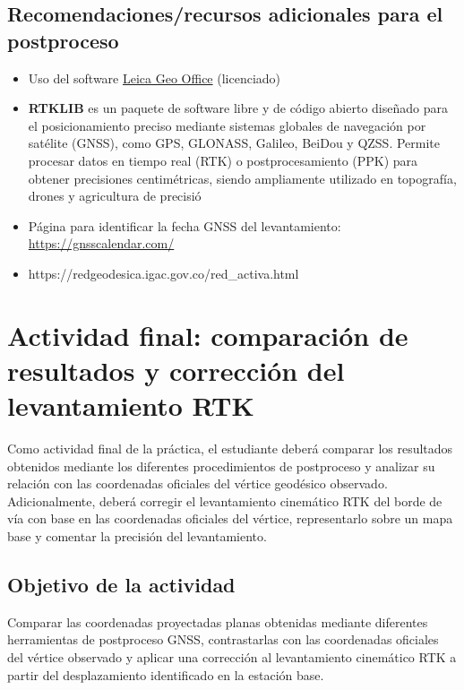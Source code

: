\documentclass[
  letterpaper,
  DIV=11,
  numbers=noendperiod]{scrartcl}
\begin{document}
\subsection{Recomendaciones/recursos adicionales para el
postproceso}\label{recomendacionesrecursos-adicionales-para-el-postproceso}

\begin{itemize}
\item
  Uso del software
  \href{https://leica-geosystems.com/es-es/rugbycl/archive-data/software/leica-geo-office}{Leica
  Geo Office} (licenciado)
\item
  \textbf{RTKLIB} es un paquete de software libre y de código abierto
  diseñado para el posicionamiento preciso mediante sistemas globales de
  navegación por satélite (GNSS), como GPS, GLONASS, Galileo, BeiDou y
  QZSS. Permite procesar datos en tiempo real (RTK) o postprocesamiento
  (PPK) para obtener precisiones centimétricas, siendo ampliamente
  utilizado en topografía, drones y agricultura de precisió
\item
  Página para identificar la fecha GNSS del levantamiento:
  \url{https://gnsscalendar.com/}
\item
  https://redgeodesica.igac.gov.co/red\_activa.html
\end{itemize}

\section{Actividad final: comparación de resultados y corrección del
levantamiento
RTK}\label{actividad-final-comparaciuxf3n-de-resultados-y-correcciuxf3n-del-levantamiento-rtk}

Como actividad final de la práctica, el estudiante deberá comparar los
resultados obtenidos mediante los diferentes procedimientos de
postproceso y analizar su relación con las coordenadas oficiales del
vértice geodésico observado. Adicionalmente, deberá corregir el
levantamiento cinemático RTK del borde de vía con base en las
coordenadas oficiales del vértice, representarlo sobre un mapa base y
comentar la precisión del levantamiento.

\subsection{Objetivo de la actividad}\label{objetivo-de-la-actividad}

Comparar las coordenadas proyectadas planas obtenidas mediante
diferentes herramientas de postproceso GNSS, contrastarlas con las
coordenadas oficiales del vértice observado y aplicar una corrección al
levantamiento cinemático RTK a partir del desplazamiento identificado en
la estación base.
\end{document}
